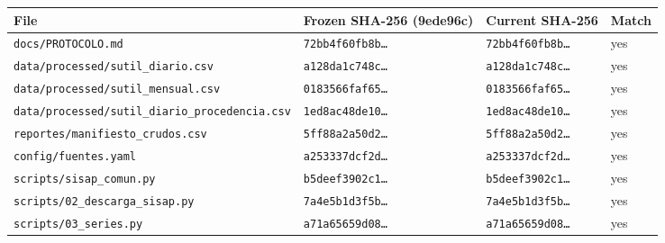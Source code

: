\begin{tabular}{llll}
\toprule
File & Frozen SHA-256 (9ede96c) & Current SHA-256 & Match \\
\midrule
\texttt{docs/PROTOCOLO.md} & \texttt{72bb4f60fb8b…} & \texttt{72bb4f60fb8b…} & yes \\
\texttt{data/processed/sutil\_diario.csv} & \texttt{a128da1c748c…} & \texttt{a128da1c748c…} & yes \\
\texttt{data/processed/sutil\_mensual.csv} & \texttt{0183566faf65…} & \texttt{0183566faf65…} & yes \\
\texttt{data/processed/sutil\_diario\_procedencia.csv} & \texttt{1ed8ac48de10…} & \texttt{1ed8ac48de10…} & yes \\
\texttt{reportes/manifiesto\_crudos.csv} & \texttt{5ff88a2a50d2…} & \texttt{5ff88a2a50d2…} & yes \\
\texttt{config/fuentes.yaml} & \texttt{a253337dcf2d…} & \texttt{a253337dcf2d…} & yes \\
\texttt{scripts/sisap\_comun.py} & \texttt{b5deef3902c1…} & \texttt{b5deef3902c1…} & yes \\
\texttt{scripts/02\_descarga\_sisap.py} & \texttt{7a4e5b1d3f5b…} & \texttt{7a4e5b1d3f5b…} & yes \\
\texttt{scripts/03\_series.py} & \texttt{a71a65659d08…} & \texttt{a71a65659d08…} & yes \\
\bottomrule
\end{tabular}
